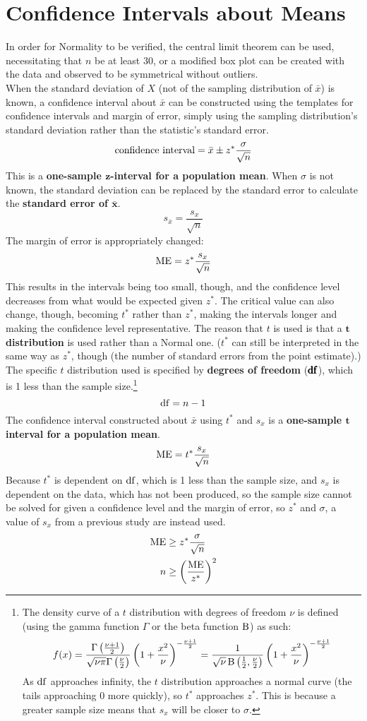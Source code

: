\documentclass[../AP_Statistics.tex]{subfiles}
\begin{document}
		\section{Confidence Intervals about Means}
			In order for Normality to be verified, the central limit theorem can be used, necessitating that $n$ be at least 30, or a modified box plot can be created with the data and observed to be symmetrical without outliers. \\
			When the standard deviation of $X$ (not of the sampling distribution of $\bar{x}$) is known, a confidence interval about $\bar{x}$ can be constructed using the templates for confidence intervals and margin of error, simply using the sampling distribution's standard deviation rather than the statistic's standard error.
			\[\text{confidence interval} = \bar{x} \pm z^*\frac{\sigma}{\sqrt{n}}\]
			This is a \textbf{one-sample $\pmb{z}$-interval for a population mean}.
			When $\sigma$ is not known, the standard deviation can be replaced by the standard error to calculate the \textbf{standard error of $\pmb{\bar{x}}$}.
			\[s_{\bar{x}} = \frac{s_x}{\sqrt{n}}\]
			The margin of error is appropriately changed:
			\[\operatorname{ME} = z^*\frac{s_x}{\sqrt{n}}\]
			This results in the intervals being too small, though, and the confidence level decreases from what would be expected given $z^*$. The critical value can also change, though, becoming $t^*$ rather than $z^*$, making the intervals longer and making the confidence level representative. The reason that $t$ is used is that a $\pmb{t}$\textbf{ distribution} is used rather than a Normal one. ($t^*$ can still be interpreted in the same way as $z^*$, though (the number of standard errors from the point estimate).) \\
			The specific $t$ distribution used is specified by \textbf{degrees of freedom} ($\pmb{\operatorname{\mathrm{df}}}$), which  is 1 less than the sample size.\footnote{The density curve of a $t$ distribution with degrees of freedom $\nu$ is defined (using the gamma function $\Gamma$ or the beta function $\operatorname{\mathrm{B}}$) as such:\[f(x) = \frac{\Gamma\left(\frac{\nu + 1}{2}\right)}{\sqrt{\nu\pi}\Gamma\left(\frac{\nu}{2}\right)}\left(1 + \frac{x^2}{\nu}\right)^{-\frac{\nu + 1}{2}} = \frac{1}{\sqrt{\nu}\operatorname{\mathrm{B}}\left(\frac{1}{2},\frac{\nu}{2}\right)}\left(1 + \frac{x^2}{\nu}\right)^{-\frac{\nu + 1}{2}}\]As $\operatorname{\mathrm{df}}$ approaches infinity, the $t$ distribution approaches a normal curve (the tails approaching 0 more quickly), so $t^*$ approaches $z^*$. This is because a greater sample size means that $s_x$ will be closer to $\sigma$.} \\
			\[\operatorname{\mathrm{df}} = n - 1\]
			The confidence interval constructed about $\bar{x}$ using $t^*$ and $s_x$ is a \textbf{one-sample $\pmb{t}$ interval for a population mean}.
			\[\operatorname{ME} = t^*\frac{s_x}{\sqrt{n}}\]
			Because $t^*$ is dependent on $\operatorname{\mathrm{df}}$, which is 1 less than the sample size, and $s_x$ is dependent on the data, which has not been produced, so the sample size cannot be solved for given a confidence level and the margin of error, so $z^*$ and $\sigma$, a value of $s_x$ from a previous study are instead used.
			\begin{align*}
				\operatorname{ME} &\ge z^*\frac{\sigma}{\sqrt{n}} \\
				n &\ge \left(\frac{\operatorname{ME}}{z^*}\right)^2
			\end{align*}
\end{document}
